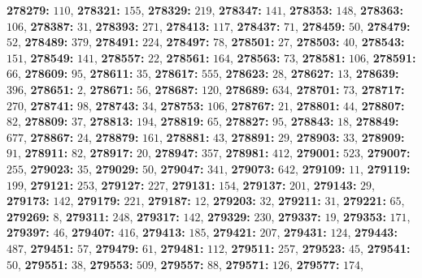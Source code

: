 \textsf{\bfseries 278279:} $110$, \textsf{\bfseries 278321:} $155$, \textsf{\bfseries 278329:} $219$, \textsf{\bfseries 278347:} $141$, \textsf{\bfseries 278353:} $148$, \textsf{\bfseries 278363:} $106$, \textsf{\bfseries 278387:} $31$, \textsf{\bfseries 278393:} $271$, \textsf{\bfseries 278413:} $117$, \textsf{\bfseries 278437:} $71$, \textsf{\bfseries 278459:} $50$, \textsf{\bfseries 278479:} $52$, \textsf{\bfseries 278489:} $379$, \textsf{\bfseries 278491:} $224$, \textsf{\bfseries 278497:} $78$, \textsf{\bfseries 278501:} $27$, \textsf{\bfseries 278503:} $40$, \textsf{\bfseries 278543:} $151$, \textsf{\bfseries 278549:} $141$, \textsf{\bfseries 278557:} $22$, \textsf{\bfseries 278561:} $164$, \textsf{\bfseries 278563:} $73$, \textsf{\bfseries 278581:} $106$, \textsf{\bfseries 278591:} $66$, \textsf{\bfseries 278609:} $95$, \textsf{\bfseries 278611:} $35$, \textsf{\bfseries 278617:} $555$, \textsf{\bfseries 278623:} $28$, \textsf{\bfseries 278627:} $13$, \textsf{\bfseries 278639:} $396$, \textsf{\bfseries 278651:} $2$, \textsf{\bfseries 278671:} $56$, \textsf{\bfseries 278687:} $120$, \textsf{\bfseries 278689:} $634$, \textsf{\bfseries 278701:} $73$, \textsf{\bfseries 278717:} $270$, \textsf{\bfseries 278741:} $98$, \textsf{\bfseries 278743:} $34$, \textsf{\bfseries 278753:} $106$, \textsf{\bfseries 278767:} $21$, \textsf{\bfseries 278801:} $44$, \textsf{\bfseries 278807:} $82$, \textsf{\bfseries 278809:} $37$, \textsf{\bfseries 278813:} $194$, \textsf{\bfseries 278819:} $65$, \textsf{\bfseries 278827:} $95$, \textsf{\bfseries 278843:} $18$, \textsf{\bfseries 278849:} $677$, \textsf{\bfseries 278867:} $24$, \textsf{\bfseries 278879:} $161$, \textsf{\bfseries 278881:} $43$, \textsf{\bfseries 278891:} $29$, \textsf{\bfseries 278903:} $33$, \textsf{\bfseries 278909:} $91$, \textsf{\bfseries 278911:} $82$, \textsf{\bfseries 278917:} $20$, \textsf{\bfseries 278947:} $357$, \textsf{\bfseries 278981:} $412$, \textsf{\bfseries 279001:} $523$, \textsf{\bfseries 279007:} $255$, \textsf{\bfseries 279023:} $35$, \textsf{\bfseries 279029:} $50$, \textsf{\bfseries 279047:} $341$, \textsf{\bfseries 279073:} $642$, \textsf{\bfseries 279109:} $11$, \textsf{\bfseries 279119:} $199$, \textsf{\bfseries 279121:} $253$, \textsf{\bfseries 279127:} $227$, \textsf{\bfseries 279131:} $154$, \textsf{\bfseries 279137:} $201$, \textsf{\bfseries 279143:} $29$, \textsf{\bfseries 279173:} $142$, \textsf{\bfseries 279179:} $221$, \textsf{\bfseries 279187:} $12$, \textsf{\bfseries 279203:} $32$, \textsf{\bfseries 279211:} $31$, \textsf{\bfseries 279221:} $65$, \textsf{\bfseries 279269:} $8$, \textsf{\bfseries 279311:} $248$, \textsf{\bfseries 279317:} $142$, \textsf{\bfseries 279329:} $230$, \textsf{\bfseries 279337:} $19$, \textsf{\bfseries 279353:} $171$, \textsf{\bfseries 279397:} $46$, \textsf{\bfseries 279407:} $416$, \textsf{\bfseries 279413:} $185$, \textsf{\bfseries 279421:} $207$, \textsf{\bfseries 279431:} $124$, \textsf{\bfseries 279443:} $487$, \textsf{\bfseries 279451:} $57$, \textsf{\bfseries 279479:} $61$, \textsf{\bfseries 279481:} $112$, \textsf{\bfseries 279511:} $257$, \textsf{\bfseries 279523:} $45$, \textsf{\bfseries 279541:} $50$, \textsf{\bfseries 279551:} $38$, \textsf{\bfseries 279553:} $509$, \textsf{\bfseries 279557:} $88$, \textsf{\bfseries 279571:} $126$, \textsf{\bfseries 279577:} $174$, 
